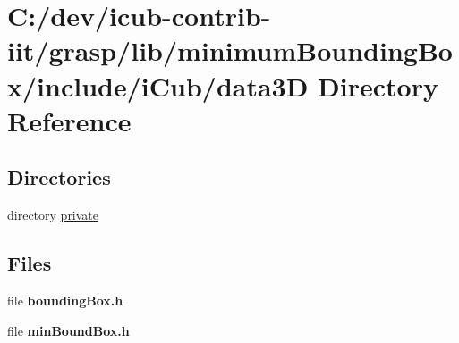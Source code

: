 \section{C\+:/dev/icub-\/contrib-\/iit/grasp/lib/minimum\+Bounding\+Box/include/i\+Cub/data3\+D Directory Reference}
\label{dir_8d4074a084bebdaf3f815ef80999fbc8}
\subsection*{Directories}
\begin{DoxyCompactItemize}
\item 
directory \hyperlink{dir_fdfe962e94f3dc14414472837d873bb2}{private}
\end{DoxyCompactItemize}
\subsection*{Files}
\begin{DoxyCompactItemize}
\item 
file {\bfseries bounding\+Box.\+h}
\item 
file {\bfseries min\+Bound\+Box.\+h}
\end{DoxyCompactItemize}
